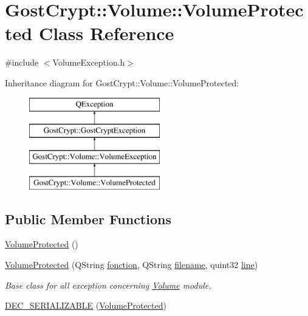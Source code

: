 \hypertarget{class_gost_crypt_1_1_volume_1_1_volume_protected}{}\section{Gost\+Crypt\+:\+:Volume\+:\+:Volume\+Protected Class Reference}
\label{class_gost_crypt_1_1_volume_1_1_volume_protected}


{\ttfamily \#include $<$Volume\+Exception.\+h$>$}

Inheritance diagram for Gost\+Crypt\+:\+:Volume\+:\+:Volume\+Protected\+:\begin{figure}[H]
\begin{center}
\leavevmode
\includegraphics[height=4.000000cm]{class_gost_crypt_1_1_volume_1_1_volume_protected}
\end{center}
\end{figure}
\subsection*{Public Member Functions}
\begin{DoxyCompactItemize}
\item 
\hyperlink{class_gost_crypt_1_1_volume_1_1_volume_protected_a405e93118bf51d57caf945f3e347fe4f}{Volume\+Protected} ()
\item 
\hyperlink{class_gost_crypt_1_1_volume_1_1_volume_protected_ac7bed4b2f8522a325cefd43ee5f6eb42}{Volume\+Protected} (Q\+String \hyperlink{class_gost_crypt_1_1_gost_crypt_exception_a29b8c93d5efbb1ff369107385725a939}{fonction}, Q\+String \hyperlink{class_gost_crypt_1_1_gost_crypt_exception_a749a12375f4ba9d502623b99d8252f38}{filename}, quint32 \hyperlink{class_gost_crypt_1_1_gost_crypt_exception_abf506d911f12a4e969eea500f90bd32c}{line})
\begin{DoxyCompactList}\small\item\em Base class for all exception concerning \hyperlink{class_gost_crypt_1_1_volume_1_1_volume}{Volume} module. \end{DoxyCompactList}\item 
\hyperlink{class_gost_crypt_1_1_volume_1_1_volume_protected_a5f2d40272e3193a7d2f7a5ac7105c89e}{D\+E\+C\+\_\+\+S\+E\+R\+I\+A\+L\+I\+Z\+A\+B\+LE} (\hyperlink{class_gost_crypt_1_1_volume_1_1_volume_protected}{Volume\+Protected})
\end{DoxyCompactItemize}
